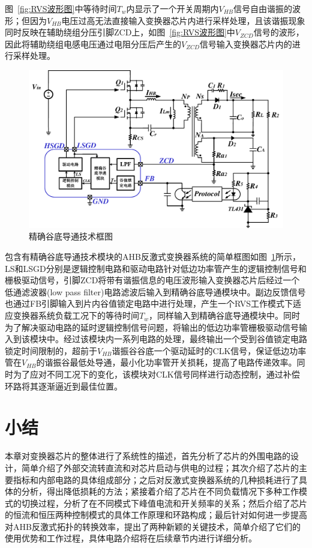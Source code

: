 图~\ref{fig:RVS波形图}中等待时间$T_w$内显示了一个开关周期内$V_{HB}$信号自由谐振的波形；但因为$V_{HB}$电压过高无法直接输入变换器芯片内进行采样处理，且该谐振现象同时反映在辅助绕组分压引脚ZCD上，如图~\ref{fig:RVS波形图}中$V_{ZCD}$信号的波形，因此将辅助绕组电感电压通过电阻分压后产生的$V_{ZCD}$信号输入变换器芯片内的进行采样处理。

\begin{figure}[htbp] 
    \centering
    \includegraphics[width=0.8\linewidth]{figures/精确谷底导通技术框图.pdf}
    \caption{精确谷底导通技术框图}
    \label{fig:精确谷底导通技术框图}
\end{figure}


包含有精确谷底导通技术模块的AHB反激式变换器系统的简单框图如图~\ref{fig:精确谷底导通技术框图}所示，LS和LSGD分别是逻辑控制电路和驱动电路针对低边功率管产生的逻辑控制信号和栅极驱动信号，引脚ZCD将带有谐振信息的电压波形输入变换器芯片后经过一个低通滤波器(low pass filter)电路滤波后输入到精确谷底导通模块中。副边反馈信号也通过FB引脚输入到片内谷值锁定电路中进行处理，产生一个RVS工作模式下适应变换器系统负载工况下的等待时间$T_w$，同样输入到精确谷底导通模块中。同时为了解决驱动电路的延时逻辑控制信号问题，将输出的低边功率管栅极驱动信号输入到该模块中。经过该模块内一系列电路的处理，最终输出一个受到谷值锁定电路锁定时间限制的，超前于$V_{HB}$谐振谷谷底一个驱动延时的CLK信号，保证低边功率管在$V_{HB}$的谐振谷最低处导通，最小化功率管开关损耗，提高了电路传递效率。同时为了应对不同工况下的变化，该模块对CLK信号同样进行动态控制，通过补偿环路将其逐渐逼近到最佳位置。






\section{小结}

本章对变换器芯片的整体进行了系统性的描述，首先分析了芯片的外围电路的设计，简单介绍了外部交流转直流和对芯片启动与供电的过程；其次介绍了芯片的主要指标和内部电路的具体组成部分；之后对反激式变换器系统的几种损耗进行了具体的分析，得出降低损耗的方法；紧接着介绍了芯片在不同负载情况下多种工作模式的切换过程，分析了在不同模式下峰值电流和开关频率的关系；然后介绍了芯片的恒流和恒压两种控制模式的具体工作原理和环路构成；最后针对如何进一步提高对AHB反激式拓扑的转换效率，提出了两种新颖的关键技术，简单介绍了它们的使用优势和工作过程，具体电路介绍将在后续章节内进行详细分析。


